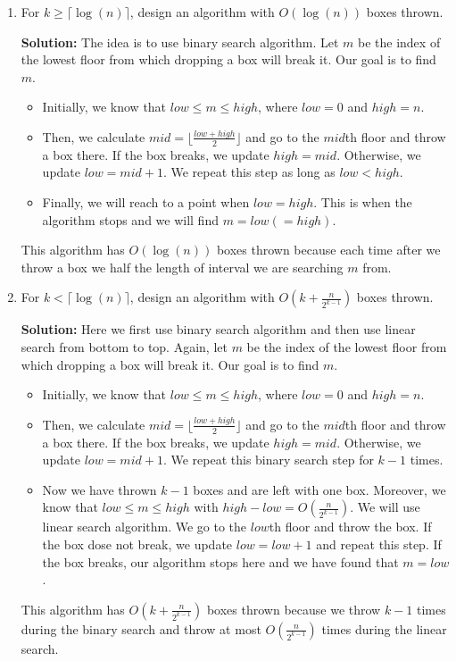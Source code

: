 \documentclass{article}
\begin{document}
\begin{enumerate}
\item For $k \geq \lceil \log(n) \rceil$, design an algorithm with
${O}(\log(n))$ boxes thrown.
\begin{tcolorbox}
\textbf{Solution:} The idea is to use binary search algorithm. 
Let $m$ be the index of the lowest floor from which dropping a box will break it.  Our goal is to find $m$. 
\begin{itemize}
\item Initially, we know that $low \leq m \leq high$, where $low = 0$ and $high = n$.
\item Then, we calculate $mid = \lfloor \frac {low + high} {2} \rfloor$ and go to the $mid$th floor and throw a box there. If the box  breaks, we update $high =  mid$. Otherwise, we update $low = mid + 1$. We repeat this step as long as $low < high$.
\item Finally, we will reach to a point when $low = high$. This is when the algorithm stops and we will find $m = low( = high)$.
\end{itemize}
This algorithm has ${O}(\log(n))$ boxes thrown because each time after we throw a box we half the length of interval we are searching $m$ from.
\end{tcolorbox}

\item For $k < \lceil \log(n) \rceil$, design an algorithm with
${O}\left(k+\frac{n}{2^{k-1}}\right)$ boxes thrown.
\begin{tcolorbox}
\textbf{Solution:} Here we first use binary search algorithm and then use linear search from bottom to top. Again, let $m$ be the index of the lowest floor from which dropping a box will break it.  Our goal is to find $m$. 
\begin{itemize}
\item Initially, we know that $low \leq m \leq high$, where $low = 0$ and $high = n$.
\item Then, we calculate $mid = \lfloor \frac {low + high} {2} \rfloor$ and go to the $mid$th floor and throw a box there. If the box  breaks, we update $high =  mid$. Otherwise, we update $low = mid + 1$. We repeat this binary search step for $k-1$ times.
\item Now we have thrown $k-1$ boxes and are left with one box. Moreover, we know that $low \leq m \leq high$ with $high - low = {O}(\frac{n}{2^{k-1}})$. We will use linear search algorithm. We go to the $low$th floor and throw the box. If the box dose not break, we update $low = low + 1$ and repeat this step. If the box breaks, our algorithm stops here and we have found that $m = low$. 
\end{itemize}
This algorithm has ${O}\left(k+\frac{n}{2^{k-1}}\right)$ boxes thrown because we throw $k-1$ times during the binary search and throw at most ${O}(\frac{n}{2^{k-1}})$ times during the linear search.
\end{tcolorbox}


\end{enumerate}
\end{document}
